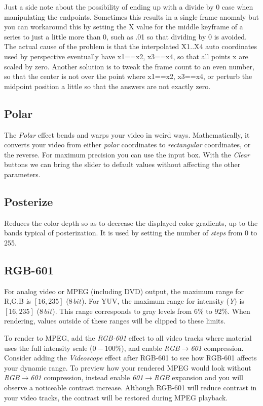 Just a side note about the possibility of ending up with a divide by 0 case when manipulating
the endpoints.  Sometimes this results in a single frame anomaly but you can workaround this
by setting the X value for the middle keyframe of a series to just a little more than 0,
such as .01 so that dividing by 0 is avoided. The actual cause of the problem is that the
interpolated X1..X4 auto coordinates used by perspective eventually have x1==x2, x3==x4, so
that all points x are scaled by zero. Another solution is to tweak the frame count to an even
number, so that the center is not over the point where x1==x2, x3==x4, or perturb the midpoint
position a little so that the answers are not exactly zero.

\subsection{Polar}%
\label{sub:polar}

The \textit{Polar} effect bends and warps your video in weird ways. Mathematically, it converts your video from either \textit{polar} coordinates to \textit{rectangular} coordinates, or the reverse. For maximum precision you can use the input box. With the \textit{Clear} buttons we can bring the slider to default values without affecting the other parameters.

\subsection{Posterize}%
\label{sub:posterize}

Reduces the color depth so as to decrease the displayed color gradients, up to the bands typical of posterization. It is used by setting the number of \textit{steps} from 0 to 255.

\subsection{RGB-601}%
\label{sub:rgb-601}

For analog video or MPEG (including DVD) output, the maximum range for R,G,B is $[16,235]$ ($8\,bit$). For YUV, the maximum range for intensity (\textit{Y}) is $[16, 235]$ ($8\,bit$). This range corresponds to gray levels from $6\%$ to $92\%$. When rendering, values outside of these ranges will be clipped to these limits.

To render to MPEG, add the \textit{RGB-601} effect to all video tracks where material uses the full intensity scale ($0-100\%$), and enable \textit{RGB$\rightarrow$601} compression. Consider adding the \textit{Videoscope} effect after RGB-601 to see how RGB-601 affects your dynamic range. To preview how your rendered MPEG would look without \textit{RGB$\rightarrow$601} compression, instead enable \textit{601$\rightarrow$RGB} expansion and you will observe a noticeable contrast increase. Although RGB-601 will reduce contrast in your video tracks, the contrast will be restored during MPEG playback.

